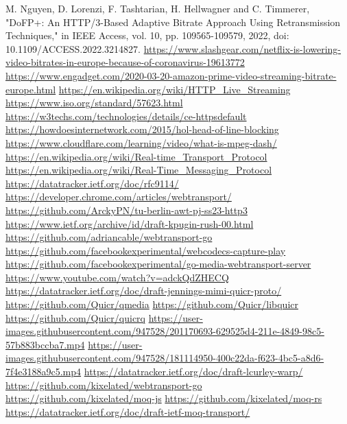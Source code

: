 \documentclass[conference]{IEEEtran}
\begin{document}
\begin{thebibliography}{00}
 M. Nguyen, D. Lorenzi, F. Tashtarian, H. Hellwagner and C. Timmerer, "DoFP+: An HTTP/3-Based Adaptive Bitrate Approach Using Retransmission Techniques," in IEEE Access, vol. 10, pp. 109565-109579, 2022, doi: 10.1109/ACCESS.2022.3214827.
 \url{https://www.slashgear.com/netflix-is-lowering-video-bitrates-in-europe-because-of-coronavirus-19613772}
 \url{https://www.engadget.com/2020-03-20-amazon-prime-video-streaming-bitrate-europe.html}
 \url{https://en.wikipedia.org/wiki/HTTP_Live_Streaming}
 \url{https://www.iso.org/standard/57623.html}
 \url{https://w3techs.com/technologies/details/ce-httpsdefault}
 \url{https://howdoesinternetwork.com/2015/hol-head-of-line-blocking}
 \url{https://www.cloudflare.com/learning/video/what-is-mpeg-dash/}
 \url{https://en.wikipedia.org/wiki/Real-time_Transport_Protocol}
 \url{https://en.wikipedia.org/wiki/Real-Time_Messaging_Protocol}
 \url{https://datatracker.ietf.org/doc/rfc9114/}
 \url{https://developer.chrome.com/articles/webtransport/}
 \url{https://github.com/ArckyPN/tu-berlin-awt-pj-ss23-http3}
 \url{https://www.ietf.org/archive/id/draft-kpugin-rush-00.html}
 \url{https://github.com/adriancable/webtransport-go}
 \url{https://github.com/facebookexperimental/webcodecs-capture-play}
 \url{https://github.com/facebookexperimental/go-media-webtransport-server}
 \url{https://www.youtube.com/watch?v=adckQdZHECQ}
 \url{https://datatracker.ietf.org/doc/draft-jennings-mimi-quicr-proto/}
 \url{https://github.com/Quicr/qmedia}
 \url{https://github.com/Quicr/libquicr}
 \url{https://github.com/Quicr/quicrq}
 \url{https://user-images.githubusercontent.com/947528/201170693-629525d4-211e-4849-98c5-57b883bccba7.mp4}
 \url{https://user-images.githubusercontent.com/947528/181114950-400c22da-f623-4bc5-a8d6-7f4e3188a9c5.mp4}
 \url{https://datatracker.ietf.org/doc/draft-lcurley-warp/}
 \url{https://github.com/kixelated/webtransport-go}
 \url{https://github.com/kixelated/moq-js}
 \url{https://github.com/kixelated/moq-rs}
 \url{https://datatracker.ietf.org/doc/draft-ietf-moq-transport/}

\end{thebibliography}
\vspace{12pt}
\end{document}
